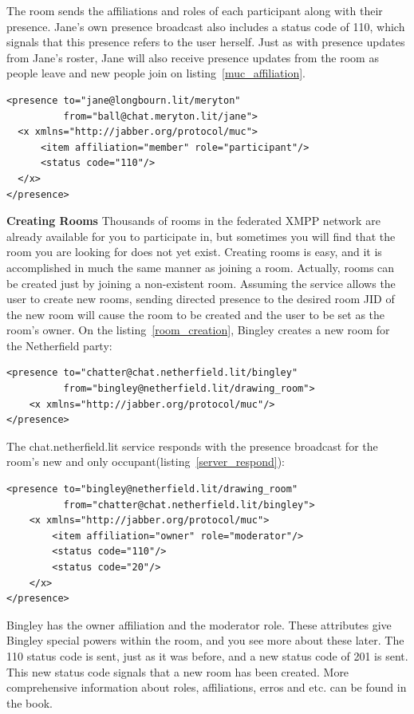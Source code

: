 The room sends the affiliations and roles of each participant along with their presence. Jane's own presence broadcast also includes a status code of 110, which signals that this presence refers to the user herself. Just as with presence updates from Jane’s roster, Jane will also receive presence updates from the room as people leave and new people join on listing~\ref{muc_affiliation}.
\begin{lstlisting}[label=muc_affiliation,caption=Server Presence Notification]
<presence to="jane@longbourn.lit/meryton"
          from="ball@chat.meryton.lit/jane">
  <x xmlns="http://jabber.org/protocol/muc">
      <item affiliation="member" role="participant"/>
      <status code="110"/>
  </x>
</presence>
\end{lstlisting}

\textbf{Creating Rooms}
Thousands of rooms in the federated XMPP network are already available for you to participate in, but sometimes you will find that the room you are looking for does not yet exist. Creating rooms is easy, and it is accomplished in much the same manner as joining a room. Actually, rooms can be created just by joining a non-existent room. Assuming the service allows the user to create new rooms, sending directed presence to the desired room JID of the new room will cause the room to be created and the user to be set as the room’s owner. On the listing~\ref{room_creation}, Bingley creates a new room for the Netherfield party:
	\begin{lstlisting}[label=room_creation,caption=MUC Room Creation]
<presence to="chatter@chat.netherfield.lit/bingley"
          from="bingley@netherfield.lit/drawing_room">
    <x xmlns="http://jabber.org/protocol/muc"/>
</presence>
		\end{lstlisting}
The chat.netherfield.lit service responds with the presence broadcast for the room’s new and only occupant(listing~\ref{server_respond}):
	\begin{lstlisting}[label=server_respond,caption=Server Respond to Room Creation]
<presence to="bingley@netherfield.lit/drawing_room"
          from="chatter@chat.netherfield.lit/bingley">
    <x xmlns="http://jabber.org/protocol/muc">
        <item affiliation="owner" role="moderator"/>
        <status code="110"/>
        <status code="20"/>
    </x>
</presence>
		\end{lstlisting}
Bingley has the owner affiliation and the moderator role. These attributes give Bingley special powers within the room, and you see more about these later. The 110 status code is sent, just as it was before, and a new status code of 201 is sent. This new status code signals that a new room has been created.
More comprehensive information about roles, affiliations, erros and etc. can be found in the book\cite{XMPPbook}.

